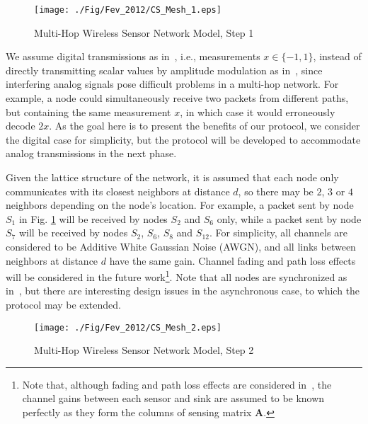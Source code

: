 \documentclass[letterpaper,conference]{IEEEtran}
\begin{document}
\begin{figure}[h]
\begin{center}
   \texttt{[image: ./Fig/Fev\_2012/CS\_Mesh\_1.eps]}
\caption{Multi-Hop Wireless Sensor Network Model, Step 1}
\label{fig:lattice1}
\end{center}
\end{figure}

We assume digital transmissions as in~\cite{Men09mar}, i.e., measurements $x \in \{-1,1\}$, instead of directly transmitting scalar values by amplitude modulation as in~\cite{Hau08mar}, since interfering analog signals pose difficult problems in a multi-hop network. For example, a node could simultaneously receive two packets from different paths, but containing the same measurement $x$, in which case it would erroneously decode $2x$. As the goal here is to present the benefits of our protocol, we consider the digital case for simplicity, but the protocol will be developed to accommodate analog transmissions in the next phase.

Given the lattice structure of the network, it is assumed that each node only communicates with its closest neighbors at distance $d$, so there may be $2$, $3$ or $4$ neighbors depending on the node's location. For example, a packet sent by node $S_1$ in Fig. \ref{fig:lattice1} will be received by nodes $S_2$ and $S_6$ only, while a packet sent by node $S_7$ will be received by nodes $S_2$, $S_6$, $S_8$ and $S_{12}$.
For simplicity, all channels are considered to be Additive White Gaussian Noise (AWGN), and all links between neighbors at distance $d$ have the same gain. Channel fading and path loss effects will be considered in the future work\footnote{Note that, although fading and path loss effects are considered in~\cite{Men09mar}, the channel gains between each sensor and sink are assumed to be known perfectly as they form the columns of sensing matrix $\mathbf{A}$.}. Note that all nodes are synchronized as in~\cite{Hau08mar}\cite{Men09mar}, but there are interesting design issues in the asynchronous case, to which the protocol may be extended.



\begin{figure}[h]
\begin{center}
   \texttt{[image: ./Fig/Fev\_2012/CS\_Mesh\_2.eps]}
\caption{Multi-Hop Wireless Sensor Network Model, Step 2}
\label{fig:lattice}
\end{center}
\end{figure}
\end{document}
